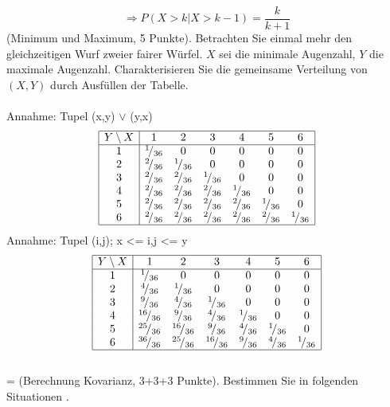 \documentclass[twoside]{article}
\begin{document}
\[
	\Rightarrow P(X > k | X > k-1) = \frac{k}{k+1}
\]
(Minimum und Maximum, 5 Punkte).
Betrachten Sie einmal mehr den gleichzeitigen Wurf zweier fairer Würfel.
$X$ sei die minimale Augenzahl, $Y$ die maximale Augenzahl.
Charakterisieren Sie die gemeinsame Verteilung von $(X,Y)$ durch Ausfüllen der Tabelle. \\
\\
Annahme: Tupel (x,y) $\lor$ (y,x)
\[
	\begin{array}{|c|cccccc|}\hline
	Y \setminus X	&	1	&	2	&	3	&	4	&	5	&	6	\\ \hline
	1&\ilfrac{1}{36}&0&0&0&0&0\\
	2&\ilfrac{2}{36}&\ilfrac{1}{36}&0&0&0&0\\
	3&\ilfrac{2}{36}&\ilfrac{2}{36}&\ilfrac{1}{36}&0&0&0\\
	4&\ilfrac{2}{36}&\ilfrac{2}{36}&\ilfrac{2}{36}&\ilfrac{1}{36}&0&0\\
	5&\ilfrac{2}{36}&\ilfrac{2}{36}&\ilfrac{2}{36}&\ilfrac{2}{36}&\ilfrac{1}{36}&0\\
	6&\ilfrac{2}{36}&\ilfrac{2}{36}&\ilfrac{2}{36}&\ilfrac{2}{36}&\ilfrac{2}{36}&\ilfrac{1}{36}\\\hline
	\end{array}
\]
Annahme: Tupel (i,j); x <= i,j <= y
\[
	\begin{array}{|c|cccccc|}\hline
	Y \setminus X	&	1	&	2	&	3	&	4	&	5	&	6	\\ \hline
	1&\ilfrac{1}{36}&0&0&0&0&0\\
	2&\ilfrac{4}{36}&\ilfrac{1}{36}&0&0&0&0\\
	3&\ilfrac{9}{36}&\ilfrac{4}{36}&\ilfrac{1}{36}&0&0&0\\
	4&\ilfrac{16}{36}&\ilfrac{9}{36}&\ilfrac{4}{36}&\ilfrac{1}{36}&0&0\\
	5&\ilfrac{25}{36}&\ilfrac{16}{36}&\ilfrac{9}{36}&\ilfrac{4}{36}&\ilfrac{1}{36}&0\\
	6&\ilfrac{36}{36}&\ilfrac{25}{36}&\ilfrac{16}{36}&\ilfrac{9}{36}&\ilfrac{4}{36}&\ilfrac{1}{36}\\\hline
	\end{array}
\]
\vspace{.3cm}\\
\fi
\ifnum\ZettelNeun=\True
{}
(Berechnung Kovarianz, 3+3+3 Punkte).
Bestimmen Sie in folgenden Situationen .\\
\end{document}

